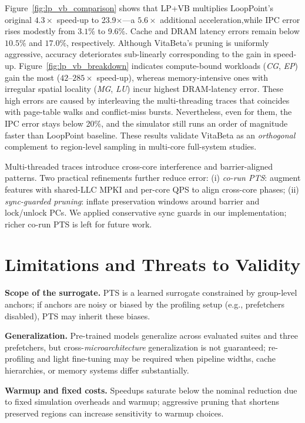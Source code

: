 \documentclass[conference]{IEEEtran}
\begin{document}
Figure~\ref{fig:lp_vb_comparison} shows that \textsc{LP+VB} multiplies
LoopPoint’s original $4.3\times$ speed-up to {23.9$\times$}—a $5.6\times$ additional acceleration,while IPC error rises modestly from $3.1\%$ to {9.6\%}.  Cache and DRAM latency errors remain below $10.5\%$ and $17.0\%$,
respectively.  Although VitaBeta’s pruning is uniformly aggressive, accuracy deteriorates sub-linearly corresponding to the gain in speed-up. Figure~\ref{fig:lp_vb_breakdown} indicates compute-bound workloads
(\textit{CG}, \textit{EP}) gain the most ($42$–$285\times$ speed-up),
whereas memory-intensive ones with irregular spatial locality (\textit{MG}, \textit{LU}) incur 
highest DRAM-latency error.  These high errors are caused by interleaving the multi-threading traces that coincides with page-table walks and conflict-miss bursts. Nevertheless, even for them, the IPC error stays below 20\%, and the simulator still runs an order of magnitude faster than  LoopPoint baseline. 
These results validate VitaBeta as an \emph{orthogonal}
complement to region-level sampling in multi-core full-system studies.  

Multi-threaded traces introduce cross-core interference and barrier-aligned patterns. Two practical refinements further reduce error: (i) \emph{co-run PTS}: augment features with shared-LLC MPKI and per-core QPS to align cross-core phases; (ii) \emph{sync-guarded pruning}: inflate preservation windows around barrier and lock/unlock PCs. We applied conservative sync guards in our implementation; richer co-run PTS is left for future work.

\section{Limitations and Threats to Validity}
\label{sec:limitations}
\textbf{Scope of the surrogate.} PTS is a learned surrogate constrained by group-level anchors; if anchors are noisy or biased by the profiling setup (e.g., prefetchers disabled), PTS may inherit these biases. 

\textbf{Generalization.} Pre-trained models generalize across evaluated suites and three prefetchers, but cross-\emph{microarchitecture} generalization is not guaranteed; re-profiling and light fine-tuning may be required when pipeline widths, cache hierarchies, or memory systems differ substantially. 

\textbf{Warmup and fixed costs.} Speedups saturate below the nominal reduction due to fixed simulation overheads and warmup; aggressive pruning that shortens preserved regions can increase sensitivity to warmup choices.
\end{document}
